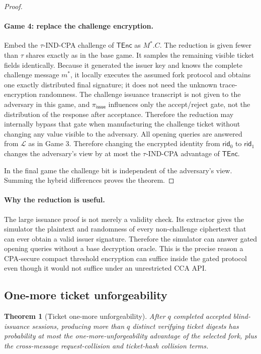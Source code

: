 \documentclass[11pt]{article}
\newtheorem{theorem}[definition]{Theorem}
\newcommand{\TEnc}{\mathsf{TEnc}}
\newcommand{\rid}{\mathsf{rid}}
\begin{document}
\begin{proof}
\paragraph{Game 4: replace the challenge encryption.}
Embed the $\tau$-IND-CPA challenge of $\TEnc$ as $M^*.C$.  The reduction is
given fewer than $\tau$ shares exactly as in the base game.  It samples the
remaining visible ticket fields identically.  Because it generated the issuer
key and knows the complete challenge message $m^*$, it locally executes the
assumed fork protocol and obtains one exactly distributed final signature;
it does not need the unknown trace-encryption randomness.
The challenge issuance transcript is not given to the adversary in this game,
and $\pi_{\mathsf{issue}}$ influences only the accept/reject gate, not the
distribution of the response after acceptance.  Therefore the reduction may
internally bypass that gate when manufacturing the challenge ticket without
changing any value visible to the adversary.
All opening queries are answered from $\mathcal L$ as in Game 3.  Therefore
changing the encrypted
identity from $\rid_0$ to $\rid_1$ changes the adversary's view by at most the
$\tau$-IND-CPA advantage of $\TEnc$.

In the final game the challenge bit is independent of the adversary's view.
Summing the hybrid differences proves the theorem.
\end{proof}

\paragraph{Why the reduction is useful.}
The large issuance proof is not merely a validity check.  Its extractor gives
the simulator the plaintext and randomness of every non-challenge ciphertext
that can ever obtain a valid issuer signature.  Therefore the simulator can
answer gated opening queries without a base decryption oracle.  This is the
precise reason a CPA-secure compact threshold encryption can suffice inside the
gated protocol even though it would not suffice under an unrestricted CCA API.

\subsection{One-more ticket unforgeability}

\begin{theorem}[Ticket one-more unforgeability]
After $q$ completed accepted blind-issuance sessions, producing more than $q$
distinct verifying ticket digests has probability at most the
one-more-unforgeability advantage of the selected fork, plus the
cross-message request-collision and
ticket-hash collision terms.
\end{theorem}
\end{document}
